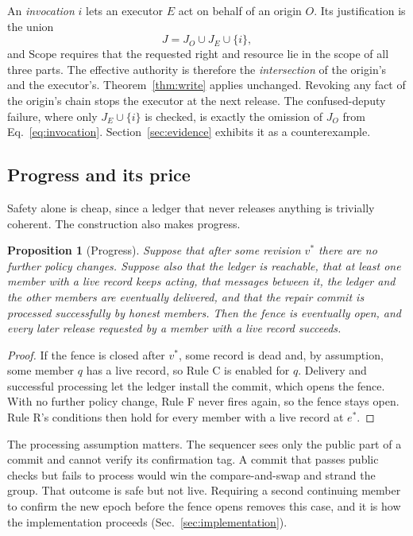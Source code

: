 \documentclass[aps,prx,reprint,superscriptaddress,nofootinbib,floatfix]{revtex4-2}
\newtheorem{proposition}{Proposition}
\theoremstyle{remark}
\newcommand{\Static}{\mathrm{Scope}}
\begin{document}
An \emph{invocation} $i$ lets an executor $E$ act on behalf of an origin $O$. Its justification is the union
\begin{equation}
J=J_O\cup J_E\cup\{i\},
\label{eq:invocation}
\end{equation}
and $\Static$ requires that the requested right and resource lie in the scope of all three parts. The effective authority is therefore the \emph{intersection} of the origin's and the executor's. Theorem~\ref{thm:write} applies unchanged. Revoking any fact of the origin's chain stops the executor at the next release. The confused-deputy failure, where only $J_E\cup\{i\}$ is checked, is exactly the omission of $J_O$ from Eq.~\eqref{eq:invocation}. Section~\ref{sec:evidence} exhibits it as a counterexample.

\subsection{Progress and its price}

Safety alone is cheap, since a ledger that never releases anything is trivially coherent. The construction also makes progress.

\begin{proposition}[Progress]\label{prop:progress}
Suppose that after some revision $v^\ast$ there are no further policy changes. Suppose also that the ledger is reachable, that at least one member with a live record keeps acting, that messages between it, the ledger and the other members are eventually delivered, and that the repair commit is processed successfully by honest members. Then the fence is eventually open, and every later release requested by a member with a live record succeeds.
\end{proposition}
\begin{proof}
If the fence is closed after $v^\ast$, some record is dead and, by assumption, some member $q$ has a live record, so Rule C is enabled for $q$. Delivery and successful processing let the ledger install the commit, which opens the fence. With no further policy change, Rule F never fires again, so the fence stays open. Rule R's conditions then hold for every member with a live record at $e^\ast$.
\end{proof}

The processing assumption matters. The sequencer sees only the public part of a commit and cannot verify its confirmation tag. A commit that passes public checks but fails to process would win the compare-and-swap and strand the group. That outcome is safe but not live. Requiring a second continuing member to confirm the new epoch before the fence opens removes this case, and it is how the implementation proceeds (Sec.~\ref{sec:implementation}).
\end{document}
